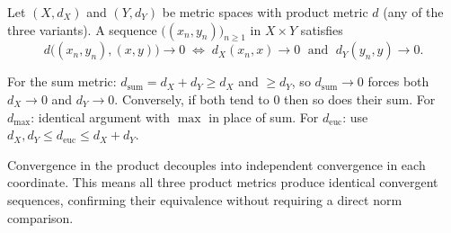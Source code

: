 \begin{proposition}
\label{prop:product-convergence}
Let $(X, d_X)$ and $(Y, d_Y)$ be metric spaces with product metric $d$
(any of the three variants).
A sequence $\bigl((x_n, y_n)\bigr)_{n \ge 1}$ in $X \times Y$ satisfies
\[
d\bigl((x_n,y_n),(x,y)\bigr) \to 0
\;\iff\;
d_X(x_n,x) \to 0 \;\text{ and }\; d_Y(y_n,y) \to 0.
\]
\end{proposition}

\begin{remark*}
For the sum metric: $d_{\mathrm{sum}} = d_X + d_Y \ge d_X$ and $\ge d_Y$,
so $d_{\mathrm{sum}} \to 0$ forces both $d_X \to 0$ and $d_Y \to 0$.
Conversely, if both tend to $0$ then so does their sum.
For $d_{\max}$: identical argument with $\max$ in place of sum.
For $d_{\mathrm{euc}}$: use $d_X, d_Y \le d_{\mathrm{euc}} \le d_X + d_Y$.
\end{remark*}

\begin{remark*}[Consequence]
Convergence in the product decouples into independent convergence in each
coordinate. This means all three product metrics produce identical convergent
sequences, confirming their equivalence without requiring a direct norm comparison.
\end{remark*}